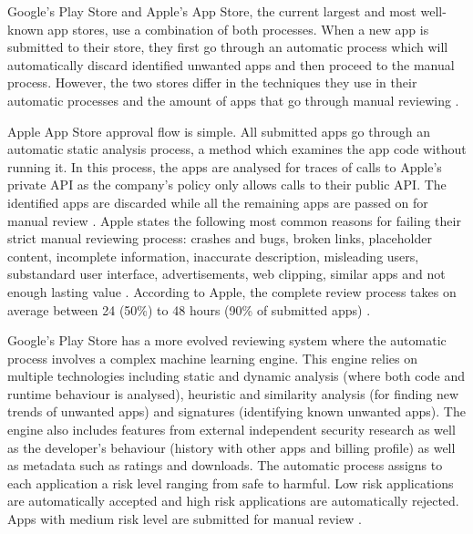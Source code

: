 \medskip

Google's Play Store and Apple's App Store, the current largest and most well-known app stores, use a combination of both processes. When a new app is submitted to their store, they first go through an automatic process which will automatically discard identified unwanted apps and then proceed to the manual process. However, the two stores differ in the techniques they use in their automatic processes and the amount of apps that go through manual reviewing \cite{AppleInsiderWebsite, AndroidWhitePaper}.

\medskip

Apple App Store approval flow is simple. All submitted apps go through an automatic static analysis process, a method which examines the app code without running it. In this process, the apps are analysed for traces of calls to Apple's private API as the company's policy only allows calls to their public API. The identified apps are discarded while all the remaining apps are passed on for manual review \cite{AppleInsiderWebsite, AppleApprovalFortune}. Apple states the following most common reasons for failing their strict manual reviewing process: crashes and bugs, broken links, placeholder content, incomplete information, inaccurate description, misleading users, substandard user interface, advertisements, web clipping, similar apps and not enough lasting value \cite{AppleReviewRejections}. According to Apple, the complete review process takes on average between 24 (50\%) to 48 hours (90\% of submitted apps) \cite{AppleReviewTime}. 

\medskip

Google's Play Store has a more evolved reviewing system where the automatic process involves a complex machine learning engine. This engine relies on multiple technologies including static and dynamic analysis (where both code and runtime behaviour is analysed), heuristic and similarity analysis (for finding new trends of unwanted apps) and signatures (identifying known unwanted apps). The engine also includes features from external independent security research as well as the developer's behaviour (history with other apps and billing profile) as well as metadata such as ratings and downloads. The automatic process assigns to each application a risk level ranging from safe to harmful. Low risk applications are automatically accepted and high risk applications are automatically rejected. Apps with medium risk level are submitted for manual review \cite{AndroidWhitePaper}. 

